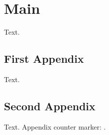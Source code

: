 \documentclass[a4paper,12pt]{report}
\begin{document}
\chapter{Main}
Text.
\appendixChapter
\section{First Appendix}
Text.
\section{Second Appendix}
Text.
Appendix counter marker: \anexeCount{}.
\end{document}
